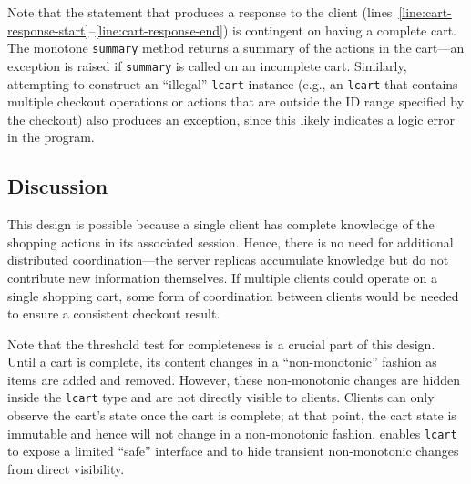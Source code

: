 Note that the statement that produces a response to the client
(lines~\ref{line:cart-response-start}--\ref{line:cart-response-end}) is
contingent on having a complete cart. The monotone \texttt{summary} method
returns a summary of the actions in the cart---an exception is raised if
\texttt{summary} is called on an incomplete cart. Similarly, attempting to
construct an ``illegal'' \texttt{lcart} instance (e.g., an \texttt{lcart} that
contains multiple checkout operations or actions that are outside the ID range
specified by the checkout) also produces an exception, since this likely
indicates a logic error in the program.

\subsection{Discussion}
This design is possible because a single client has complete knowledge of the
shopping actions in its associated session. Hence, there is no need for
additional distributed coordination---the server replicas accumulate knowledge
but do not contribute new information themselves. If multiple clients could
operate on a single shopping cart, some form of coordination between clients
would be needed to ensure a consistent checkout result.

Note that the threshold test for completeness is a crucial part of this
design. Until a cart is complete, its content changes in a ``non-monotonic''
fashion as items are added and removed. However, these non-monotonic changes are
hidden inside the \texttt{lcart} type and are not directly visible to
clients. Clients can only observe the cart's state once the cart is complete; at
that point, the cart state is immutable and hence will not change in a
non-monotonic fashion. \lang enables \texttt{lcart} to expose a limited ``safe''
interface and to hide transient non-monotonic changes from direct visibility.


